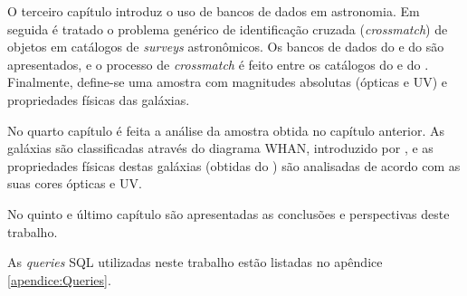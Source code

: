 O terceiro capítulo introduz o uso de bancos de dados em astronomia. Em seguida
é tratado o problema genérico de identificação cruzada ({\em crossmatch}) de
objetos em catálogos de {\em surveys} astronômicos. Os bancos de dados do \SDSS
e do \starlight são apresentados, e o processo de {\em crossmatch} é feito entre
os catálogos do \SDSS e do \galex. Finalmente, define-se uma amostra com
magnitudes absolutas (ópticas e UV) e propriedades físicas das galáxias.

No quarto capítulo é feita a análise da amostra obtida no capítulo anterior. As
galáxias são classificadas através do diagrama WHAN, introduzido por
\citet{CidFernandes2010, CidFernandes2011}, e as propriedades físicas destas
galáxias (obtidas do \starlight) são analisadas de acordo com as suas cores
ópticas e UV.

No quinto e último capítulo são apresentadas as conclusões e perspectivas deste
trabalho.

As {\em queries} SQL utilizadas neste trabalho estão listadas no apêndice
\ref{apendice:Queries}.

